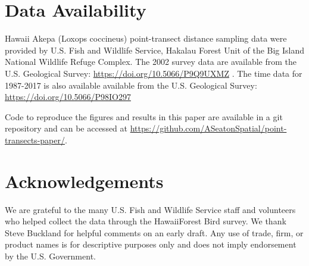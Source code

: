 \documentclass{statsoc}
\newcommand{\hawaii}{Hawai\textquotesingle i}   %
\begin{document}
\section*{Data Availability} 

Hawaii Akepa (Loxops coccineus) point-transect distance sampling data were provided by U.S. Fish and Wildlife Service, Hakalau Forest Unit of the Big Island National Wildlife Refuge Complex. The 2002 survey data are available from the U.S. Geological Survey: \url{https://doi.org/10.5066/P9Q9UXMZ} \citep{camp_datarelease_2002}.  The time data for 1987-2017 is also available  available from the U.S. Geological Survey: \url{https://doi.org/10.5066/P98IO297} \citep{camp_datarelease_all}

Code to reproduce the figures and results in this paper are available in a git repository and can be accessed at \url{https://github.com/ASeatonSpatial/point-transects-paper/}.

\section*{Acknowledgements}

We are grateful to the many U.S. Fish and Wildlife Service staff and volunteers who helped collect the data through the \hawaii Forest Bird survey. We thank Steve Buckland for helpful comments on an early draft.  Any use of trade, firm, or product names is for descriptive purposes only and does not imply endorsement by the U.S. Government.

\clearpage


\end{document}
